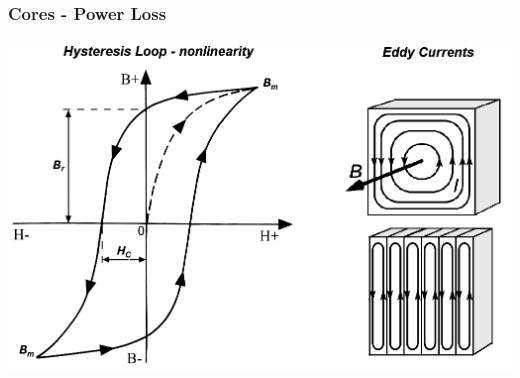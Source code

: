 \documentclass{beamer}
\begin{document}
	\begin{frame}
	\frametitle{Cores - Power Loss}
	\begin{center}
		\includegraphics[scale=0.38]{obr08_smycka.png}
	\end{center}
  \end{frame}
\end{document}
